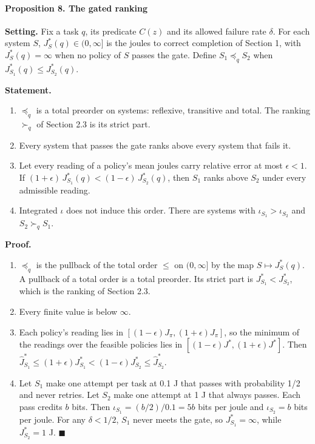 \documentclass[
  10pt,
]{article}
\providecommand{\tightlist}{%
  \setlength{\itemsep}{0pt}\setlength{\parskip}{0pt}}
\begin{document}
\paragraph{Proposition 8. The gated
ranking}\label{proposition-8.-the-gated-ranking}

\textbf{Setting.} Fix a task \(q\), its predicate \(C(z)\) and its
allowed failure rate \(\delta\). For each system \(S\),
\(J^*_S(q) \in (0, \infty]\) is the joules to correct completion of
Section 1, with \(J^*_S(q) = \infty\) when no policy of \(S\) passes the
gate. Define \(S_1 \preceq_q S_2\) when
\(J^*_{S_1}(q) \le J^*_{S_2}(q)\).

\textbf{Statement.}

\begin{enumerate}
\def\labelenumi{\arabic{enumi}.}
\tightlist
\item
  \(\preceq_q\) is a total preorder on systems: reflexive, transitive
  and total. The ranking \(\succ_q\) of Section 2.3 is its strict part.
\item
  Every system that passes the gate ranks above every system that fails
  it.
\item
  Let every reading of a policy's mean joules carry relative error at
  most \(\epsilon < 1\). If
  \((1+\epsilon)\,J^*_{S_1}(q) < (1-\epsilon)\,J^*_{S_2}(q)\), then
  \(S_1\) ranks above \(S_2\) under every admissible reading.
\item
  Integrated \(\iota\) does not induce this order. There are systems
  with \(\iota_{S_1} > \iota_{S_2}\) and \(S_2 \succ_q S_1\).
\end{enumerate}

\textbf{Proof.}

\begin{enumerate}
\def\labelenumi{\arabic{enumi}.}
\tightlist
\item
  \(\preceq_q\) is the pullback of the total order \(\le\) on
  \((0, \infty]\) by the map \(S \mapsto J^*_S(q)\). A pullback of a
  total order is a total preorder. Its strict part is
  \(J^*_{S_1} < J^*_{S_2}\), which is the ranking of Section 2.3.
\item
  Every finite value is below \(\infty\).
\item
  Each policy's reading lies in
  \([(1-\epsilon)J_\pi, (1+\epsilon)J_\pi]\), so the minimum of the
  readings over the feasible policies lies in
  \([(1-\epsilon)J^*, (1+\epsilon)J^*]\). Then
  \(\hat J^*_{S_1} \le (1+\epsilon)J^*_{S_1} < (1-\epsilon)J^*_{S_2} \le \hat J^*_{S_2}\).
\item
  Let \(S_1\) make one attempt per task at 0.1 J that passes with
  probability 1/2 and never retries. Let \(S_2\) make one attempt at 1 J
  that always passes. Each pass credits \(b\) bits. Then
  \(\iota_{S_1} = (b/2)/0.1 = 5b\) bits per joule and
  \(\iota_{S_2} = b\) bits per joule. For any \(\delta < 1/2\), \(S_1\)
  never meets the gate, so \(J^*_{S_1} = \infty\), while
  \(J^*_{S_2} = 1\) J. \(\blacksquare\)
\end{enumerate}
\end{document}

